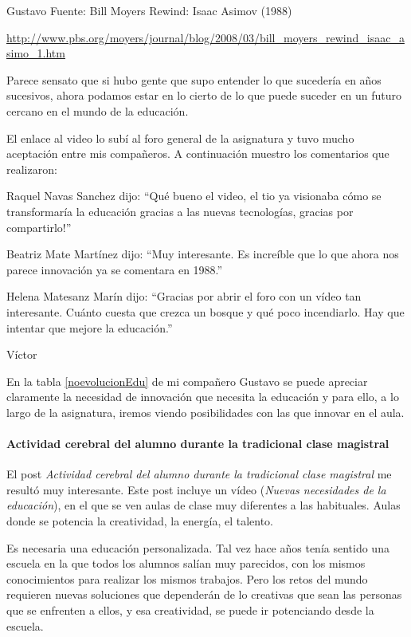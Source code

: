 \begin{opin}{\guscolor}{Gustavo}
Fuente: Bill Moyers Rewind: Isaac Asimov (1988)

\href{http://www.pbs.org/moyers/journal/blog/2008/03/bill\_moyers\_rewind\_isaac\_asimo\_1.html}{http://www.pbs.org/moyers/journal/blog/2008/03/bill\_moyers\_rewind\_isaac\_asimo\_1.htm}

Parece sensato que si hubo gente que supo entender lo que sucedería en años sucesivos, ahora podamos estar en lo cierto de lo que puede suceder en un futuro cercano en el mundo de la educación.

El enlace al video lo subí al foro general de la asignatura y tuvo mucho aceptación entre mis compañeros. A continuación muestro los comentarios que realizaron:

Raquel Navas Sanchez dijo: “Qué bueno el video, el tio ya visionaba cómo se transformaría la educación gracias a las nuevas tecnologías, gracias por compartirlo!”

Beatriz Mate Martínez dijo: “Muy interesante. Es increíble que lo que ahora nos parece innovación ya se comentara en 1988.” 

Helena Matesanz Marín dijo: “Gracias por abrir el foro con un vídeo tan interesante.  Cuánto cuesta que crezca un bosque y qué poco incendiarlo. Hay que intentar que mejore la educación.”


\end{opin}

\begin{opin}{\victorcolor}{Víctor}

En la tabla \ref{noevolucionEdu}  de mi compañero Gustavo se puede apreciar claramente la necesidad de innovación que necesita la educación y para ello, a lo largo de la asignatura, iremos viendo posibilidades con las que innovar en el aula.

\paragraph{Actividad cerebral del alumno durante la tradicional clase magistral}

El post \textit{Actividad cerebral del alumno durante la tradicional clase magistral} me resultó muy interesante.
%
Este post incluye un vídeo (\textit{Nuevas necesidades de la educación}), en el que se ven aulas de clase muy diferentes a las habituales. 
%
Aulas donde se potencia la creatividad, la energía, el talento.

Es necesaria una educación personalizada. 
%
Tal vez hace años tenía sentido una escuela en la que todos los alumnos salían muy parecidos, con los mismos conocimientos para realizar los mismos trabajos.
%
Pero los retos del mundo requieren nuevas soluciones que dependerán de lo creativas que sean las personas que se enfrenten a ellos, y esa creatividad, se puede ir potenciando desde la escuela.


\end{opin}

